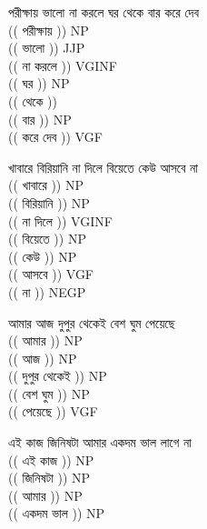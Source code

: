 \documentclass[11pt,a4paper]{article}
\begin{document}
\begin{enumerate}
{		\item পরীক্ষায় ভালো না করলে ঘর থেকে বার করে দেব  \\
		$ $\\
		\textcolor{diff}{(( পরীক্ষায় ))} NP\\
		\textcolor{diff}{(( ভালো ))} JJP\\
		\textcolor{diff}{(( না করলে ))} VGINF\\
		\textcolor{diff}{(( ঘর ))} NP\\
		\textcolor{diff}{(( থেকে  ))} \\
		\textcolor{diff}{(( বার ))} NP\\
		\textcolor{diff}{(( করে দেব ))} VGF\\
$ $\\
		\item খাবারে বিরিয়ানি না দিলে বিয়েতে কেউ আসবে না  \\
		$ $\\
		\textcolor{diff}{(( খাবারে ))} NP\\
		\textcolor{diff}{(( বিরিয়ানি ))} NP\\
		\textcolor{diff}{(( না দিলে ))} VGINF\\
		\textcolor{diff}{(( বিয়েতে ))} NP\\
		\textcolor{diff}{(( কেউ ))} NP\\
		\textcolor{diff}{(( আসবে ))} VGF\\
		\textcolor{diff}{(( না ))} NEGP\\
$ $\\
		\item আমার আজ দুপুর থেকেই বেশ ঘুম পেয়েছে  \\
		$ $\\
		\textcolor{diff}{(( আমার ))} NP\\
		\textcolor{diff}{(( আজ ))} NP\\
		\textcolor{diff}{(( দুপুর থেকেই ))} NP\\
		\textcolor{diff}{(( বেশ ঘুম ))} NP\\
		\textcolor{diff}{(( পেয়েছে ))} VGF\\
$ $\\
		\item এই কাজ জিনিষটা আমার একদম ভাল লাগে না  \\
		$ $\\
		\textcolor{diff}{(( এই কাজ ))} NP\\
		\textcolor{diff}{(( জিনিষটা ))} NP\\
		\textcolor{diff}{(( আমার ))} NP\\
		\textcolor{diff}{(( একদম ভাল ))} NP\\
}
\end{enumerate}
\end{document}
